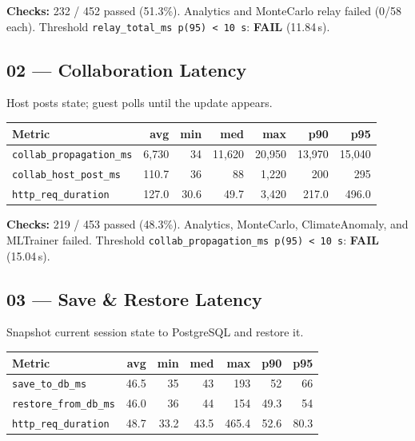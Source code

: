 \documentclass[11pt,a4paper]{article}
\newcommand{\fail}{\textcolor{fail}{\textbf{FAIL}}}
\begin{document}
\medskip
\noindent\textbf{Checks:} 232 / 452 passed (51.3\%).
Analytics and MonteCarlo relay failed (0/58 each).
Threshold \texttt{relay\_total\_ms p(95) < 10\,s}: \fail{} (11.84\,s).

\subsection{02 — Collaboration Latency}

Host posts state; guest polls until the update appears.

\begin{tabular}{@{}lrrrrrr@{}}
\toprule
\textbf{Metric} & \textbf{avg} & \textbf{min} & \textbf{med} & \textbf{max} & \textbf{p90} & \textbf{p95} \\
\midrule
\texttt{collab\_propagation\_ms} & 6,730  & 34   & 11,620 & 20,950 & 13,970 & 15,040 \\
\texttt{collab\_host\_post\_ms}  & 110.7  & 36   & 88     & 1,220  & 200    & 295    \\
\texttt{http\_req\_duration}     & 127.0  & 30.6 & 49.7   & 3,420  & 217.0  & 496.0  \\
\bottomrule
\end{tabular}

\medskip
\noindent\textbf{Checks:} 219 / 453 passed (48.3\%).
Analytics, MonteCarlo, ClimateAnomaly, and MLTrainer failed.
Threshold \texttt{collab\_propagation\_ms p(95) < 10\,s}: \fail{} (15.04\,s).

\subsection{03 — Save \& Restore Latency}

Snapshot current session state to PostgreSQL and restore it.

\begin{tabular}{@{}lrrrrrr@{}}
\toprule
\textbf{Metric} & \textbf{avg} & \textbf{min} & \textbf{med} & \textbf{max} & \textbf{p90} & \textbf{p95} \\
\midrule
\texttt{save\_to\_db\_ms}       & 46.5  & 35   & 43   & 193   & 52    & 66   \\
\texttt{restore\_from\_db\_ms}  & 46.0  & 36   & 44   & 154   & 49.3  & 54   \\
\texttt{http\_req\_duration}    & 48.7  & 33.2 & 43.5 & 465.4 & 52.6  & 80.3 \\
\bottomrule
\end{tabular}
\end{document}

